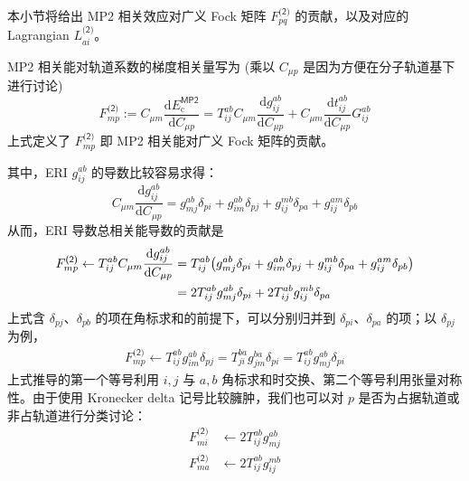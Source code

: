 本小节将给出 MP2 相关效应对广义 Fock 矩阵 $F_{pq}^\textsf{(2)}$ 的贡献，以及对应的 Lagrangian $L_{ai}^\textsf{(2)}$。

MP2 相关能对轨道系数的梯度相关量写为 (乘以 $C_{\mu p}$ 是因为方便在分子轨道基下进行讨论)
\begin{equation}
  \label{eq.def-fock-cmp2}
  F_{mp}^\textsf{(2)} := C_{\mu m} \frac{\mathrm{d} E_\mathrm{c}^\textsf{MP2}}{\mathrm{d} C_{\mu p}} = T_{ij}^{ab} C_{\mu m} \frac{\mathrm{d} g_{ij}^{ab}}{\mathrm{d} C_{\mu p}} + C_{\mu m} \frac{\mathrm{d} t_{ij}^{ab}}{\mathrm{d} C_{\mu p}} G_{ij}^{ab}
\end{equation}
上式定义了 $F_{mp}^\textsf{(2)}$ 即 MP2 相关能对广义 Fock 矩阵的贡献。

其中，ERI $g_{ij}^{ab}$ 的导数比较容易求得：
\begin{equation}
  C_{\mu m} \frac{\mathrm{d} g_{ij}^{ab}}{\mathrm{d} C_{\mu p}} = g_{mj}^{ab} \delta_{pi} + g_{im}^{ab} \delta_{pj} + g_{ij}^{mb} \delta_{pa} + g_{ij}^{am} \delta_{pb}
\end{equation}
从而，ERI 导数总相关能导数的贡献是
\begin{align}
  F_{mp}^\textsf{(2)} \leftarrow T_{ij}^{ab} C_{\mu m} \frac{\mathrm{d} g_{ij}^{ab}}{\mathrm{d} C_{\mu p}} &= T_{ij}^{ab} \big( g_{mj}^{ab} \delta_{pi} + g_{im}^{ab} \delta_{pj} + g_{ij}^{mb} \delta_{pa} + g_{ij}^{am} \delta_{pb} \big) \notag\\
  &= 2 T_{ij}^{ab} g_{mj}^{ab} \delta_{pi} + 2 T_{ij}^{ab} g_{ij}^{mb} \delta_{pa}
\end{align}
上式含 $\delta_{pj}$、$\delta_{pb}$ 的项在角标求和的前提下，可以分别归并到 $\delta_{pi}$、$\delta_{pa}$ 的项；以 $\delta_{pj}$ 为例，
\begin{align*}
  F_{mp}^\textsf{(2)} \leftarrow T_{ij}^{ab} g_{im}^{ab} \delta_{pj} = T_{ji}^{ba} g_{jm}^{ba} \delta_{pi} = T_{ij}^{ab} g_{mj}^{ab} \delta_{pi}
\end{align*}
上式推导的第一个等号利用 $i, j$ 与 $a, b$ 角标求和时交换、第二个等号利用张量对称性。由于使用 Kronecker delta 记号比较臃肿，我们也可以对 $p$ 是否为占据轨道或非占轨道进行分类讨论：
\begin{align}
  \label{eq.fock-cmp2-part1-mi}
  F_{mi}^\textsf{(2)} &\leftarrow 2 T_{ij}^{ab} g_{mj}^{ab} \\
  \label{eq.fock-cmp2-part1-ma}
  F_{ma}^\textsf{(2)} &\leftarrow 2 T_{ij}^{ab} g_{ij}^{mb}
\end{align}

